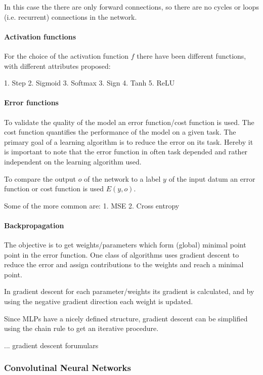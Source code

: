 In this case the there are only forward connections, so there are no cycles or loops (i.e. recurrent) connections in the network.

\paragraph{Activation functions}

For the choice of the activation function $f$ there have been different functions, with different attributes proposed:

1. Step
2. Sigmoid
3. Softmax
3. Sign
4. Tanh
5. ReLU

\paragraph{Error functions}

To validate the quality of the model an error function/cost function is used.
The cost function quantifies the performance of the model on a given task.
The primary goal of a learning algorithm is to reduce the error on its task.
Hereby it is important to note that the error function in often task depended and rather independent on the learning algorithm used.  

To compare the output $o$ of the network to a label $y$ of the input datum an error function or cost function is used $E(y,o)$.

Some of the more common are:
1. MSE
2. Cross entropy

\paragraph{Backpropagation}

The objective is to get weights/parameters which form (global) minimal point point in the error function. 
One class of algorithms uses gradient descent to reduce the error and assign contributions to the weights and reach a minimal point.

In gradient descent for each parameter/weights its gradient is calculated, and by using the negative gradient direction each weight is updated.

Since MLPs have a nicely defined structure, gradient descent can be simplified using the chain rule to get an iterative procedure.
 
... gradient descent forumulars

\subsubsection{Convolutinal Neural Networks}

